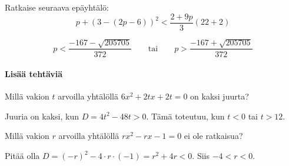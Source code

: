 \begin{tehtavasivu}
\begin{tehtava} %
    Ratkaise seuraava epäyhtälö:
    $$p+(3-(2p-6))^2<\dfrac{2+9p}{3}(22+2)$$
    \begin{vastaus}
        $$p<\dfrac{-167-\sqrt{205705}}{372} \qquad\text{tai}\qquad p>\dfrac{-167+\sqrt{205705}}{372}$$
    \end{vastaus}
\end{tehtava}

\paragraph*{Lisää tehtäviä}

\begin{tehtava}
	Millä vakion $t$ arvoilla yhtälöllä $6x^2+2tx+2t=0$ on kaksi juurta?
	\begin{vastaus}
		Juuria on kaksi, kun $D=4t^2-48t>0$. Tämä toteutuu, kun $t < 0$ tai $t > 12$.
	\end{vastaus}
\end{tehtava}

\begin{tehtava}
	Millä vakion $r$ arvoilla yhtälöllä $rx^2-rx-1 = 0$ ei ole ratkaisua?
	\begin{vastaus}
		Pitää olla $D=(-r)^2-4 \cdot r \cdot (-1)=r^2+4r<0$. Siis $-4 < r < 0$.
	\end{vastaus}
\end{tehtava}

\end{tehtavasivu}

